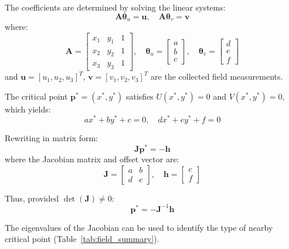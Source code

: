 \documentclass[lettersize,journal]{IEEEtran}
\begin{document}
The coefficients are determined by solving the linear systems:
\begin{equation}
\mathbf{A}\boldsymbol{\theta}_u = \mathbf{u}, \quad \mathbf{A}\boldsymbol{\theta}_v = \mathbf{v}
\end{equation}
where:
\begin{equation}
\mathbf{A} = \begin{bmatrix} x_1 & y_1 & 1 \\ x_2 & y_2 & 1 \\ x_3 & y_3 & 1 \end{bmatrix}, \quad \boldsymbol{\theta}_u = \begin{bmatrix} a \\ b \\ c \end{bmatrix}, \quad \boldsymbol{\theta}_v = \begin{bmatrix} d \\ e \\ f \end{bmatrix}
\end{equation}
and $\mathbf{u} = [u_1, u_2, u_3]^T$, $\mathbf{v} = [v_1, v_2, v_3]^T$ are the collected field measurements.

The critical point $\mathbf{p}^* = (x^*, y^*)$ satisfies $U(x^*, y^*) = 0$ and $V(x^*, y^*) = 0$, which yields:
\begin{equation}
ax^* + by^* + c = 0, \quad dx^* + ey^* + f = 0
\end{equation}

Rewriting in matrix form:
\begin{equation}
\mathbf{J}\mathbf{p}^* = -\mathbf{h}
\end{equation}
where the Jacobian matrix and offset vector are:
\begin{equation}
\mathbf{J} = \begin{bmatrix} a & b \\ d & e \end{bmatrix}, \quad \mathbf{h} = \begin{bmatrix} c \\ f \end{bmatrix}
\end{equation}

Thus, provided $\det(\mathbf{J}) \neq 0$:
\begin{equation}
\mathbf{p}^* = -\mathbf{J}^{-1}\mathbf{h}
\end{equation}

The eigenvalues of the Jacobian can be used to identify the type of nearby critical point (Table~\ref{tab:field_summary}).
\end{document}
